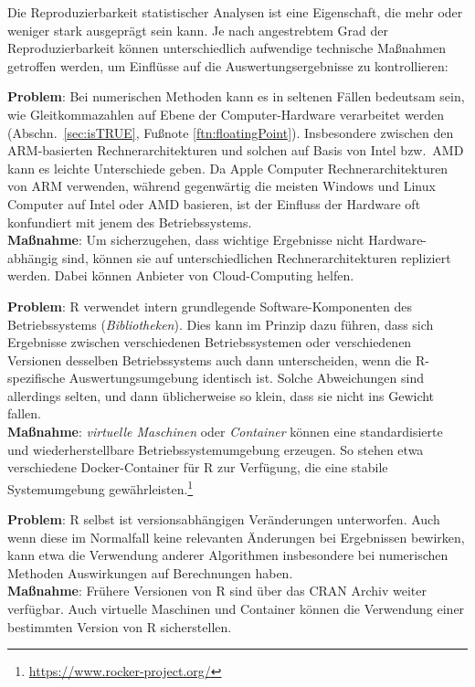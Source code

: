 Die Reproduzierbarkeit statistischer Analysen ist eine Eigenschaft, die mehr oder weniger stark ausgeprägt sein kann. Je nach angestrebtem Grad der Reproduzierbarkeit können unterschiedlich aufwendige technische Maßnahmen getroffen werden, um Einflüsse auf die Auswertungsergebnisse zu kontrollieren:

\textbf{Problem}: Bei numerischen Methoden kann es in seltenen Fällen bedeutsam sein, wie Gleitkommazahlen auf Ebene der Computer-Hardware verarbeitet werden (Abschn.\ \ref{sec:isTRUE}, Fußnote \ref{ftn:floatingPoint}). Insbesondere zwischen den ARM-basierten Rechnerarchitekturen und solchen auf Basis von Intel bzw.\ AMD kann es leichte Unterschiede geben. Da Apple Computer Rechnerarchitekturen von ARM verwenden, während gegenwärtig die meisten Windows und Linux Computer auf Intel oder AMD basieren, ist der Einfluss der Hardware oft konfundiert mit jenem des Betriebssystems.\\
\textbf{Maßnahme}: Um sicherzugehen, dass wichtige Ergebnisse nicht Hardware-abhängig sind, können sie auf unterschiedlichen Rechnerarchitekturen repliziert werden. Dabei können Anbieter von Cloud-Computing helfen.

\textbf{Problem}: R verwendet intern grundlegende Software-Komponenten des Betriebssystems (\emph{Bibliotheken}). Dies kann im Prinzip dazu führen, dass sich Ergebnisse zwischen verschiedenen Betriebssystemen oder verschiedenen Versionen desselben Betriebssystems auch dann unterscheiden, wenn die R-spezifische Auswertungsumgebung identisch ist. Solche Abweichungen sind allerdings selten, und dann üblicherweise so klein, dass sie nicht ins Gewicht fallen.\\
\textbf{Maßnahme}: \emph{virtuelle Maschinen} oder \emph{Container} können eine standardisierte und wiederherstellbare Betriebssystemumgebung erzeugen. So stehen etwa verschiedene Docker-Container für R \cite{Boettiger2017} zur Verfügung, die eine stabile Systemumgebung gewährleisten.\footnote{\url{https://www.rocker-project.org/}}

\textbf{Problem}: R selbst ist versionsabhängigen Veränderungen unterworfen. Auch wenn diese im Normalfall keine relevanten Änderungen bei Ergebnissen bewirken, kann etwa die Verwendung anderer Algorithmen insbesondere bei numerischen Methoden Auswirkungen auf Berechnungen haben.\\
\textbf{Maßnahme}: Frühere Versionen von R sind über das CRAN Archiv weiter verfügbar. Auch virtuelle Maschinen und Container können die Verwendung einer bestimmten Version von R sicherstellen.

